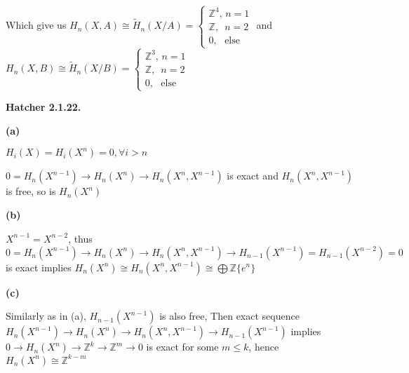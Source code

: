 \documentclass[12pt]{article}
\begin{document}
\begin{center}
\end{center}
\par
Which give us $H_n(X,A)\cong \tilde{H}_n(X/A)=
\begin{cases}
\mathbb{Z}^4,\,n=1\\
\mathbb{Z},\,\,\,n=2\\
0,\,\,\,\,\text{else}
\end{cases}$ and $H_n(X,B)\cong \tilde{H}_n(X/B)=
\begin{cases}
\mathbb{Z}^3,\,n=1\\
\mathbb{Z},\,\,\,n=2\\
0,\,\,\,\,\text{else}
\end{cases}$ \par
\textbf{Hatcher 2.1.22.} \par
\textbf{(a)} \par
$H_i(X)=H_i(X^n)=0,\forall i>n$ \par
$0=H_n(X^{n-1})\rightarrow H_n(X^n)\rightarrow H_n(X^n,X^{n-1})$ is exact and $H_n(X^n,X^{n-1})$ is free, so is $H_n(X^n)$ \par
\textbf{(b)} \par
$X^{n-1}=X^{n-2}$, thus $0=H_n(X^{n-1})\rightarrow H_n(X^n)\rightarrow H_n(X^n,X^{n-1})\rightarrow H_{n-1}(X^{n-1})=H_{n-1}(X^{n-2})=0$ is exact implies $H_n(X^n)\cong H_n(X^n,X^{n-1})\cong \bigoplus\mathbb{Z}\{e^n\}$ \par
\textbf{(c)} \par
Similarly as in (a), $H_{n-1}(X^{n-1})$ is also free, Then exact sequence $H_n(X^{n-1})\rightarrow H_n(X^n)\rightarrow H_n(X^n,X^{n-1})\rightarrow H_{n-1}(X^{n-1})$ implies $0\rightarrow H_n(X^n)\rightarrow \mathbb{Z}^k\rightarrow \mathbb{Z}^m\rightarrow 0$ is exact for some $m\leq k$, hence $H_n(X^n)\cong \mathbb{Z}^{k-m}$ \par
\end{document}

